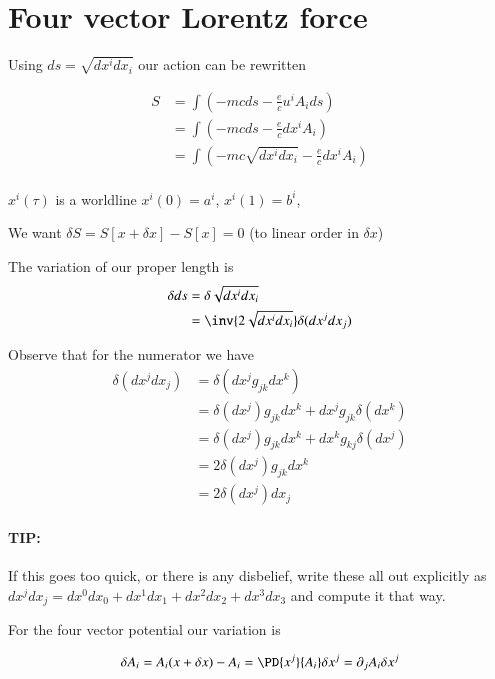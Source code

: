\section{Four vector Lorentz force}

Using $ds = \sqrt{ dx^i dx_i } $ our action can be rewritten

\begin{align*}
S 
&= \int \left( -m c ds - \frac{e}{c} u^i A_i ds \right) \\
&= \int \left( -m c ds - \frac{e}{c} dx^i A_i \right) \\
&= \int \left( -m c \sqrt{ dx^i dx_i} - \frac{e}{c} dx^i A_i \right) \\
\end{align*}

$x^i(\tau)$ is a worldline $x^i(0) = a^i$, $x^i(1) = b^i$, 

We want $\delta S = S[ x + \delta x ] - S[ x ] = 0$ (to linear order in $\delta x$)

The variation of our proper length is
\begin{align*}
\delta ds 
&=
\delta \sqrt{ dx^i dx_i } \\
&= \inv{ 2 \sqrt{ dx^i dx_i }} \delta (dx^j dx_j)
\end{align*}

Observe that for the numerator we have
\begin{align*}
\delta (dx^j dx_j) 
&= \delta ( dx^j g_{jk} dx^k ) \\
&= \delta ( dx^j ) g_{jk} dx^k + dx^j g_{jk} \delta ( dx^k ) \\
&= \delta ( dx^j ) g_{jk} dx^k + dx^k g_{kj} \delta ( dx^j ) \\
&= 2 \delta ( dx^j ) g_{jk} dx^k \\
&= 2 \delta ( dx^j ) dx_j 
\end{align*}

\paragraph{TIP:} If this goes too quick, or there is any disbelief, write these all out explicitly as $dx^j dx_j = dx^0 dx_0 + dx^1 dx_1 + dx^2 dx_2 + dx^3 dx_3$ and compute it that way.

For the four vector potential our variation is

\begin{equation}\label{eqn:relativisticElectrodynamicsL10:310}
\delta A_i = A_i(x + \delta x) - A_i = \PD{x^j}{A_i} \delta x^j = \partial_j A_i \delta x^j
\end{equation}

